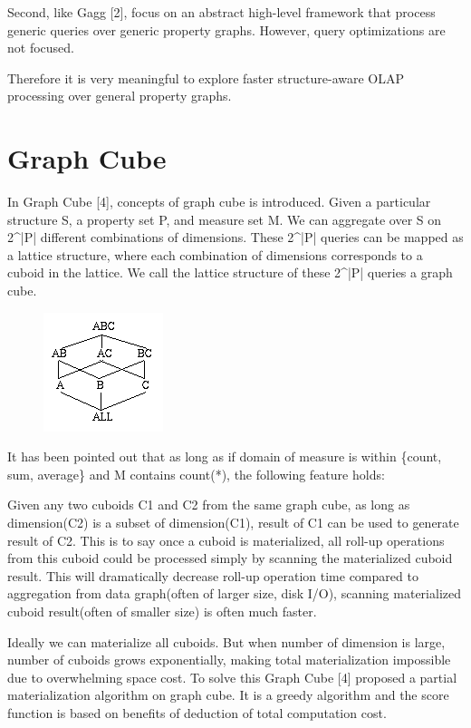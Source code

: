 Second, like Gagg [2], focus on an abstract high-level framework that process generic queries over generic property graphs. However, query optimizations are not focused.  
 
Therefore it is very meaningful to explore faster structure-aware OLAP processing over general property graphs.



\section{Graph Cube}

In Graph Cube [4], concepts of graph cube is introduced. Given a particular structure S, a property set P, and measure set M. We can aggregate over S on 2\^{}|P| different combinations of dimensions. These 2\^{}|P| queries can be mapped as a lattice structure, where each combination of dimensions corresponds to a cuboid in the lattice. We call the lattice structure of these 2\^{}|P| queries a graph cube.

\begin {figure}[H]
\centering
\includegraphics[scale=1]{pic/22.png}
\end{figure}

It has been pointed out that as long as if domain of measure is within \{count, sum, average\} and M contains count(*), the following feature holds:
 
Given any two cuboids C1 and C2 from the same graph cube, as long as dimension(C2) is a subset of dimension(C1), result of C1 can be used to generate result of C2. This is to say once a cuboid is materialized, all roll-up operations from this cuboid could be processed simply by scanning the materialized cuboid result. This will dramatically decrease roll-up operation time compared to aggregation from data graph(often of larger size, disk I/O), scanning materialized cuboid result(often of smaller size) is often much faster.


 
Ideally we can materialize all cuboids. But when number of dimension is large, number of cuboids grows exponentially, making total materialization impossible due to overwhelming space cost. To solve this Graph Cube [4] proposed a partial materialization algorithm on graph cube. It is a greedy algorithm and the score function is based on benefits of deduction of total computation cost.
